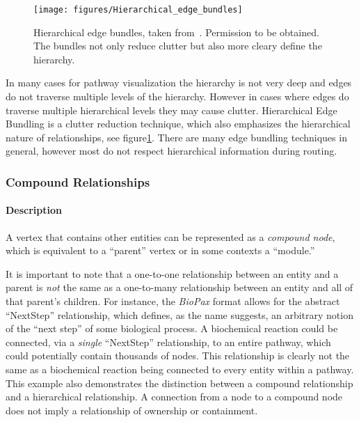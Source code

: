 \begin{figure}[htb]
  \centering
  \texttt{[image: figures/Hierarchical\_edge\_bundles]}
  \caption{\label{fig:Hierarchical_edge_bundles} Hierarchical edge bundles, taken from~\cite{Holten2006}. Permission to be obtained. The bundles not only reduce clutter but also more cleary define the hierarchy.}
\end{figure}

In many cases for pathway visualization the hierarchy is not very deep and edges do not traverse multiple levels of the hierarchy.
However in cases where edges do traverse  multiple hierarchical levels they may cause clutter.
Hierarchical Edge Bundling \cite{Holten2006} is a clutter reduction technique, which also emphasizes the hierarchical nature of relationships, see figure\ref{fig:Hierarchical_edge_bundles}. There are many edge bundling techniques in general, however most do not respect hierarchical information during routing.

\subsubsection{Compound Relationships}

\paragraph{Description}

A vertex that contains other entities can be represented as a \textit{compound node}, which is equivalent to a ``parent'' vertex or in some contexts a ``module.''

It is important to note that a one-to-one relationship between an entity and a parent is \textit{not} the same as a one-to-many relationship between an entity and all of that parent's children.
For instance, the \textit{BioPax} format allows for the abstract ``NextStep'' relationship, which defines, as the name suggests, an arbitrary notion of the ``next step'' of some biological process.
A biochemical reaction could be connected, via a \textit{single} ``NextStep'' relationship, to an entire pathway, which could potentially contain thousands of nodes.
This relationship is clearly not the same as a biochemical reaction being connected to every entity within a pathway.
This example also demonstrates the distinction between a compound relationship and a hierarchical relationship.
A connection from a node to a compound node does not imply a relationship of ownership or containment.

